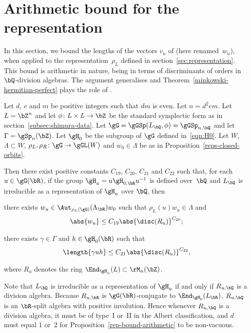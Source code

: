 \section{Arithmetic bound for the representation} \label{sec:rep-bound}

In this section, we bound the lengths of the vectors $v_u$ of \cite[Th.\,1.2]{QRTUI} (here renamed~$w_u$), when applied to the representation~$\rho_L$ defined in section~\ref{sec:representation}. This bound is arithmetic in nature, being in terms of discriminants of orders in $\bQ$-division algebras. The argument generalises \cite[\S 5.5]{QRTUI} and Theorem~\ref{minkowski-hermitian-perfect} plays the role of \cite[Lem.\,5.7]{QRTUI}.

\begin{proposition} \label{rep-bound-arithmetic}
Let $d$, $e$ and $m$ be positive integers such that $dm$ is even.
Let $n = d^2em$.
Let $L = \bZ^n$ and let $\phi \colon L \times L \to \bZ$ be the standard symplectic form as in section~\ref{subsec:shimura-data}.
Let $\gG = \gGSp(L_\bQ, \phi) = \gGSp_{n,\bQ}$ and let $\Gamma = \gSp_n(\bZ)$.
Let $\gH_0$ be the subgroup of $\gG$ defined in~\eqref{eqn:H0}.
Let $W$, $\Lambda \subset W$, $\rho_L, \rho_R \colon \gG \to \gGL(W)$ and $w_0 \in \Lambda$ be as in Proposition~\ref{reps-closed-orbits}.

Then there exist positive constants $C_{19}$, $C_{20}$, $C_{21}$ and $C_{22}$ such that,
for each $u \in \gG(\bR)$, if the group $\gH_u = u \gH_{0,\bR} u^{-1}$ is defined over~$\bQ$ and $L_\bQ$ is irreducible as a representation of $\gH_u$ over $\bQ$, then
\begin{enumeratea}
\item\label{rep-bound-arithmetica} there exists $w_u \in \Aut_{\rho_L(\gG)}(\Lambda_\bR) w_0$ such that $\rho_L(u) w_u \in \Lambda$ and
\[
\abs{w_u} \leq C_{19} \abs{\disc(R_u)}^{C_{20}};
\]
\item\label{rep-bound-arithmeticb} there exists $\gamma \in \Gamma$ and $h \in \gH_0(\bR)$ such that
\[
\length{\gamma uh} \leq C_{21} \abs{\disc(R_u)}^{C_{22}},
\]
\end{enumeratea}
where $R_u$ denotes the ring $\End_{\gH_u}(L) \subset \rM_n(\bZ)$.
\end{proposition}

Note that $L_\bQ$ is irreducible as a representation of $\gH_u$ if and only if $R_{u,\bQ}$ is a division algebra.
Because $R_{u,\bR}$ is $\gG(\bR)$-conjugate to $\End_{\gH_0}(L_\bR)$, $R_{u,\bQ}$ is an $\bR$-split algebra with positive involution. Hence whenever $R_{u,\bQ}$ is a division algebra, it must be of type~I or~II in the Albert classification, and $d$ must equal $1$ or~$2$ for Proposition~\ref{rep-bound-arithmetic} to be non-vacuous.

